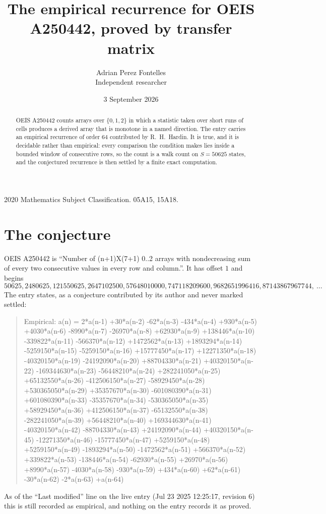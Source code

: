 \documentclass[11pt,a4paper]{article}
\title{The empirical recurrence for OEIS A250442, proved by transfer matrix}
\author{Adrian Perez Fontelles\\ \small Independent researcher}
\date{3 September 2026}
\theoremstyle{plain}
\theoremstyle{definition}
\begin{document}
\maketitle

\begin{abstract}
OEIS A250442 counts arrays over $\{0,1,2\}$ in which a statistic taken over short runs
of cells produces a derived array that is monotone in a named direction. The entry carries an
empirical recurrence of order $64$ contributed by R.~H.~Hardin. It is true, and it is
decidable rather than empirical: every comparison the condition makes lies inside a bounded
window of consecutive rows, so the count is a walk count on $S=50625$ states, and the
conjectured recurrence is then settled by a finite exact computation.
\end{abstract}

\noindent\small 2020 Mathematics Subject Classification. 05A15, 15A18.\normalsize

\section{The conjecture}

OEIS A250442 is ``Number of (n+1)X(7+1) 0..2 arrays with nondecreasing sum of every two consecutive values in every row and column.''. It has offset $1$ and begins
\[
50625, 2480625, 121550625, 2647102500, 57648010000, 747118209600, 9682651996416, 87143867967744,\ \dots
\]
The entry states, as a conjecture contributed by its author and never marked settled:
\begin{quote}
Empirical: a(n) = 2*a(n-1) +30*a(n-2) -62*a(n-3) -434*a(n-4) +930*a(n-5) +4030*a(n-6) -8990*a(n-7) -26970*a(n-8) +62930*a(n-9) +138446*a(n-10) -339822*a(n-11) -566370*a(n-12) +1472562*a(n-13) +1893294*a(n-14) -5259150*a(n-15) -5259150*a(n-16) +15777450*a(n-17) +12271350*a(n-18) -40320150*a(n-19) -24192090*a(n-20) +88704330*a(n-21) +40320150*a(n-22) -169344630*a(n-23) -56448210*a(n-24) +282241050*a(n-25) +65132550*a(n-26) -412506150*a(n-27) -58929450*a(n-28) +530365050*a(n-29) +35357670*a(n-30) -601080390*a(n-31) +601080390*a(n-33) -35357670*a(n-34) -530365050*a(n-35) +58929450*a(n-36) +412506150*a(n-37) -65132550*a(n-38) -282241050*a(n-39) +56448210*a(n-40) +169344630*a(n-41) -40320150*a(n-42) -88704330*a(n-43) +24192090*a(n-44) +40320150*a(n-45) -12271350*a(n-46) -15777450*a(n-47) +5259150*a(n-48) +5259150*a(n-49) -1893294*a(n-50) -1472562*a(n-51) +566370*a(n-52) +339822*a(n-53) -138446*a(n-54) -62930*a(n-55) +26970*a(n-56) +8990*a(n-57) -4030*a(n-58) -930*a(n-59) +434*a(n-60) +62*a(n-61) -30*a(n-62) -2*a(n-63) +a(n-64)
\end{quote}
As of the ``Last modified'' line on the live entry (Jul 23 2025 12:25:17, revision 6) this is still
recorded as empirical, and nothing on the entry records it as proved.
\end{document}
